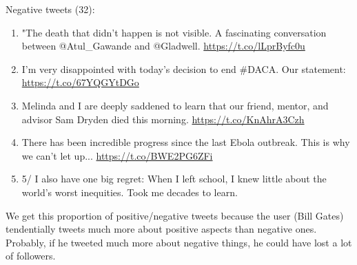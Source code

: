 \documentclass[a4paper]{article}
\begin{document}
Negative tweets (32):

\begin{enumerate}
\item "The death that didn't happen is not visible. A fascinating conversation between @Atul\_Gawande and @Gladwell. \url{https://t.co/lLprByfc0u}
\item I'm very disappointed with today's decision to end \#DACA. Our statement: \url{https://t.co/67YQGYtDGo}
\item Melinda and I are deeply saddened to learn that our friend, mentor, and advisor Sam Dryden died this morning. \url{https://t.co/KnAhrA3Czh}
\item There has been incredible progress since the last Ebola outbreak. This is why we can't let up... \url{https://t.co/BWE2PG6ZFi}
\item 5/ I also have one big regret: When I left school, I knew little about the world's worst inequities. Took me decades to learn.
\end{enumerate}

We get this proportion of positive/negative tweets because the user (Bill Gates) tendentially tweets much more about positive aspects than negative ones. Probably, if he tweeted much more about negative things, he could have lost a lot of followers.
\end{document}
